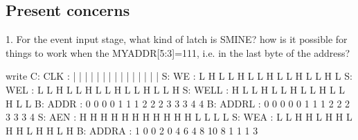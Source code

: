 \subsection{Present concerns}
     1. For the event input stage, what kind of latch is SMINE? how is it possible for things to work when the MYADDR[5:3]=111, i.e.  in the last byte of the address?


\begin{timing}{write}
C: CLK       :  | |  |  |  |  |  |  |  |  |  |  |  |  |  |  
S: WE        :  L H  L  L  H  L  L  H  L  L  H  L  L  H  L
S: WEL       :  L L  H  L  L  H  L  L  H  L  L  H  L  L  H
S: WELL      :  H L  L  H  L  L  H  L  L  H  L  L  H  L  L
B: ADDR      :  0 0  0  0  1  1  1  2  2  2  3  3  3  4  4
B: ADDRL     :  0 0  0  0  0  1  1  1  2  2  2  3  3  3  4 
S: AEN       :  H H  H  H  H  H  H  H  H  H  H  L  L  L  L 
S: WEA       :  L L  H  H  L  H  H  L  H  H  L  H  H  L  H
B: ADDRA     :  1 0  0  2  0  4  6  4  8  10 8  1  1  1  3
\end{timing}
